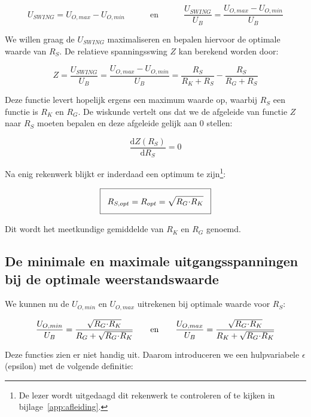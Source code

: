 \documentclass[12pt,a4paper,final,twoside,fleqn]{article}
\newcommand{\ropt}{R_{opt}}
\let\oldcdot\cdot
\renewcommand{\cdot}{\kern-.10em\oldcdot\kern-.10em}
\begin{document}
\begin{equation}
U_{SWING} = U_{O,max} - U_{O,min}\quad\qquad\text{en}\quad\qquad\dfrac{U_{SWING}}{U_B}=\dfrac{U_{O,max} - U_{O,min}}{U_B}
\end{equation}

We willen graag de $U_{SWING}$ maximaliseren en bepalen hiervoor de optimale waarde van $R_S$. De relatieve spanningsswing $Z$ kan berekend worden door:

\begin{equation}
Z = \dfrac{U_{SWING}}{U_B}=\dfrac{U_{O,max} - U_{O,min}}{U_B} = \dfrac{R_S}{R_K+R_S}-\dfrac{R_S}{R_G+R_S}
\end{equation}

Deze functie levert hopelijk ergens een maximum waarde op, waarbij $R_S$ een
functie is $R_K$ en $R_G$. De wiskunde vertelt ons dat we de afgeleide van
functie $Z$ naar $R_S$ moeten bepalen en deze afgeleide gelijk aan $0$ stellen:

\begin{equation}
\dfrac{\text{d} Z(R_S)}{\text{d} R_S} = 0
\end{equation}

Na enig rekenwerk  blijkt er inderdaad een optimum te zijn\footnote{De lezer wordt
uitgedaagd dit rekenwerk te controleren of te kijken in bijlage~\ref{app:afleiding}.}:

\begin{equation}
\setlength\fboxsep{2ex}
\boxed{R_{S,opt} = \ropt = \sqrt{R_G\cdot R_K}}
\end{equation}

Dit wordt het meetkundige gemiddelde van $R_K$ en $R_G$ genoemd.

\subsection{De minimale en maximale uitgangsspanningen bij de optimale weerstandswaarde}

 We kunnen
nu de $U_{O,min}$ en $U_{O,max}$ uitrekenen bij optimale waarde voor $R_S$:

\begin{equation}
\dfrac{U_{O,min}}{U_B} = \dfrac{\sqrt{R_G\cdot R_K}}{R_G + \sqrt{R_G\cdot R_K}}
\qquad\text{en}\qquad
\dfrac{U_{O,max}}{U_B} = \dfrac{\sqrt{R_G\cdot R_K}}{R_K + \sqrt{R_G\cdot R_K}}
\end{equation}

Deze functies zien er niet handig uit. Daarom introduceren we een hulpvariabele
$\epsilon$ (epsilon) met de volgende definitie:
\end{document}
